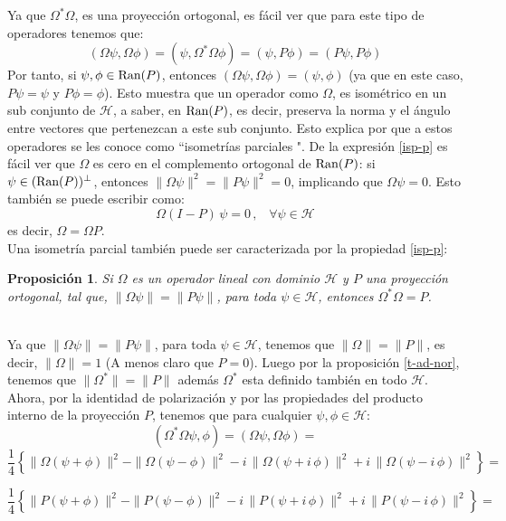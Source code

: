 \documentclass[12pt]{book}
\numberwithin{equation}{chapter}
\newtheorem{proposition}[theorem]{Proposici\'on}
\def\n{\noindent}
\def\H{\mathcal{H}}
\def\O{\Omega}
\begin{document}
Ya que $\Omega^{*} \Omega$, es una proyecci\'on ortogonal, es f\'acil ver que para este tipo de operadores tenemos que:
\begin{equation}\label{isp-p}
( \O \psi , \O \phi )= ( \psi , \O^{*}\O \phi )= ( \psi , P \phi )= (P \psi , P \phi)
\end{equation}
Por tanto, si $ \psi , \phi \in \hbox{Ran}(P) $, entonces $ ( \O \psi , \O \phi )=(\psi , \phi) $ (ya que en este caso, $P\psi=\psi$ y $P\phi= \phi$). Esto muestra que un operador como $\O$, es isom\'etrico en un sub conjunto de $\H$, a saber, en $\hbox{Ran}(P)$, es decir, preserva la norma y el \'angulo entre vectores que pertenezcan a este sub conjunto. Esto explica por que a estos operadores se les conoce como ``isometr\'ias parciales ". De la expresi\'on \eqref{isp-p} es f\'acil ver que $\O$ es cero en el complemento ortogonal de $\hbox{Ran}(P)$: si $\psi \in (\hbox{Ran}(P))^{\perp} $, entonces $\| \O \psi \|^{2} = \| P \psi \|^{2}=0 $, implicando que $\O \psi =0$. Esto tambi\'en se puede escribir como:
\begin{equation}\label{pr-om}
\O ( I - P )\, \psi = 0 \,,\,\,\,\,\, \forall \psi \in \H
\end{equation}
es decir, $ \O = \O P $.\\
Una isometr\'ia parcial tambi\'en puede ser caracterizada por la propiedad \eqref{isp-p}:
\begin{proposition}\label{isop-2}
Si $\O$ es un operador lineal con dominio $\H$ y $P$ una proyecci\'on ortogonal, tal que, $\| \O \psi \| = \| P \psi \|$, para toda $\psi \in \H$, entonces $\O^{*} \O = P$. 
\end{proposition} 
\n {\bf Demostraci\'on}\\
Ya que $ \| \O \psi \| = \| P \psi \| $, para toda $\psi \in \H$, tenemos que $\| \O \|= \|P\|$, es decir, $\| \O\| =1 $ (A menos claro que $P=0$). Luego por la proposici\'on \ref{t-ad-nor}, tenemos que $ \| \O^{*} \|=\|P\| $ adem\'as $\O^{*}$ esta definido tambi\'en en todo $\H$. Ahora, por la identidad de polarizaci\'on y por las propiedades del producto interno de la proyecci\'on $P$, tenemos que para cualquier $\psi , \phi \in \H$:
$$ (\O^{*} \O \psi , \phi )=( \O \psi , \O \phi )=  $$
$$ \frac{1}{4} \left\{ \| \O( \psi + \phi ) \|^{2} - \| \O( \psi - \phi ) \|^{2} - i\, \| \O( \psi +i\, \phi ) \|^{2} + i\, \| \O( \psi - i\,\phi ) \|^{2} \right\} = $$

$$ \frac{1}{4} \left\{ \| P( \psi + \phi ) \|^{2} - \| P( \psi - \phi ) \|^{2} - i\, \| P( \psi +i\, \phi ) \|^{2} + i\, \| P( \psi - i\,\phi ) \|^{2} \right\} = $$
\end{document}
